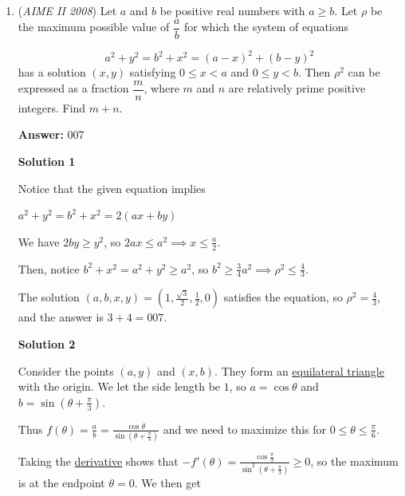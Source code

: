 \begin{enumerate}
 \href{https://mathproblemsolvingskills.wordpress.com/}{MathProblemSolvingSkills.com}

 


 


	\item (\textit{AIME II 2008}) Let $a$ and $b$ be positive real numbers with $a \ge b$. Let $\rho$ be the maximum possible value of $\dfrac{a}{b}$ for which the system of equations

 \[a^2 + y^2 = b^2 + x^2 = (a-x)^2 + (b-y)^2\]
has a solution $(x,y)$ satisfying $0 \le x < a$ and $0 \le y < b$. Then $\rho^2$ can be expressed as a fraction $\dfrac{m}{n}$, where $m$ and $n$ are relatively prime positive integers. Find $m + n$.


 
 \textbf{Answer: }007



\textbf{Solution 1}

Notice that the given equation implies

 $a^2 + y^2 = b^2 + x^2 = 2(ax + by)$

 We have $2by \ge y^2$, so $2ax \le a^2 \implies x \le \frac {a}{2}$.

 Then, notice $b^2 + x^2 = a^2 + y^2 \ge a^2$, so $b^2 \ge \frac {3}{4}a^2 \implies \rho^2 \le \frac {4}{3}$.

 The solution $(a, b, x, y) = \left(1, \frac {\sqrt {3}}{2}, \frac {1}{2}, 0\right)$ satisfies the equation, so $\rho^2 = \frac {4}{3}$, and the answer is $3 + 4 = \boxed{007}$.

 



\textbf{Solution 2}

Consider the points $(a,y)$ and $(x,b)$. They form an \href{https://artofproblemsolving.com/wiki/index.php?title=Equilateral\_triangle}{equilateral triangle} with the origin. We let the side length be $1$, so $a = \cos{\theta}$ and $b = \sin{\left(\theta + \frac {\pi}{3}\right)}$.

 Thus $f(\theta) = \frac {a}{b} = \frac {\cos{\theta}}{\sin{\left(\theta + \frac {\pi}{3}\right)}}$ and we need to maximize this for $0 \le \theta \le \frac {\pi}{6}$.

 Taking the \href{https://artofproblemsolving.com/wiki/index.php?title=Derivative}{derivative} shows that $-f'(\theta) = \frac {\cos{\frac {\pi}{3}}}{\sin^2{\left(\theta + \frac {\pi}{3}\right)}} \ge 0$, so the maximum is at the endpoint $\theta = 0$. We then get


\end{enumerate}
